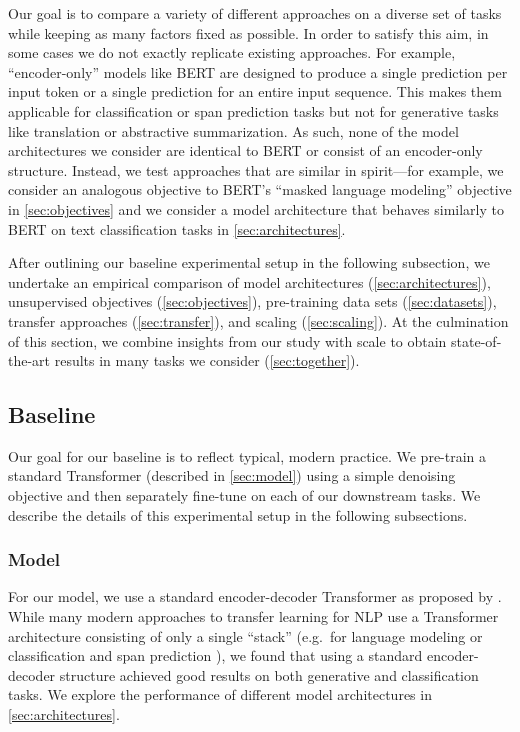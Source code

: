 Our goal is to compare a variety of different approaches on a diverse set of tasks while keeping as many factors fixed as possible. In order to satisfy this aim, in some cases we do not exactly replicate existing approaches. For example, ``encoder-only'' models like BERT \citep{devlin2018bert} are designed to produce a single prediction per input token or a single prediction for an entire input sequence. This makes them applicable for classification or span prediction tasks but not for generative tasks like translation or abstractive summarization. As such, none of the model architectures we consider are identical to BERT or consist of an encoder-only structure. Instead, we test approaches that are similar in spirit---for example, we consider an analogous objective to BERT's ``masked language modeling'' objective in \ref{sec:objectives} and we consider a model architecture that behaves similarly to BERT on text classification tasks in \ref{sec:architectures}.

After outlining our baseline experimental setup in the following subsection, we undertake an empirical comparison of model architectures (\ref{sec:architectures}), unsupervised objectives (\ref{sec:objectives}), pre-training data sets (\ref{sec:datasets}), transfer approaches (\ref{sec:transfer}), and scaling (\ref{sec:scaling}).
At the culmination of this section, we combine insights from our study with scale to obtain state-of-the-art results in many tasks we consider (\ref{sec:together}).

\subsection{Baseline}
\label{sec:baseline}

Our goal for our baseline is to reflect typical, modern practice. We pre-train a standard Transformer (described in \ref{sec:model}) using a simple denoising objective and then separately fine-tune on each of our downstream tasks. We describe the details of this experimental setup in the following subsections.

\subsubsection{Model}
\label{sec:model_hparams}

For our model, we use a standard encoder-decoder Transformer as proposed by \cite{vaswani2017attention}. While many modern approaches to transfer learning for NLP use a Transformer architecture consisting of only a single ``stack'' (e.g.\ for language modeling \citep{radford2018improving,dong2019unified} or classification and span prediction \citep{devlin2018bert,yang2019xlnet}), we found that using a standard encoder-decoder structure achieved good results on both generative and classification tasks. We explore the performance of different model architectures in \ref{sec:architectures}.

